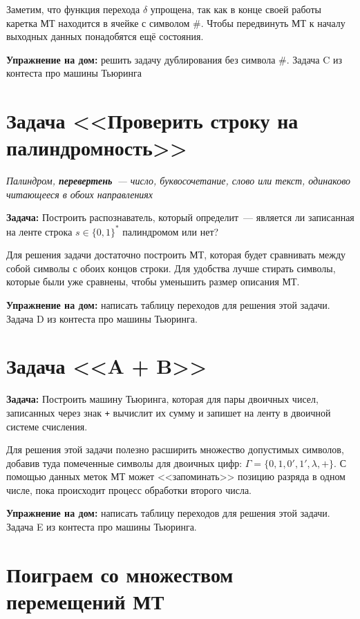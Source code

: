 \documentclass[
    11pt,
    a4paper
]{article}
\theoremstyle{definition}
\begin{document}
Заметим, что функция перехода $\delta$ упрощена, так как в конце своей работы каретка МТ находится в ячейке с символом \#. Чтобы передвинуть МТ к началу выходных данных понадобятся ещё состояния.

\textbf{Упражнение на дом:} решить задачу дублирования без символа \#. Задача C из контеста про машины Тьюринга


\section{Задача <<Проверить строку на палиндромность>>}

\textit{Палиндром, \textbf{перевертень}~--- число, буквосочетание, слово или текст, одинаково читающееся в обоих направлениях}

\textbf{Задача:} Построить распознаватель, который определит~--- является ли записанная на ленте строка $s \in \{0, 1\}^*$ палиндромом или нет?

Для решения задачи достаточно построить МТ, которая будет сравнивать между собой символы с обоих концов строки. Для удобства лучше стирать символы, которые были уже сравнены, чтобы уменьшить размер описания МТ.

\textbf{Упражнение на дом:} написать таблицу переходов для решения этой задачи. Задача D из контеста про машины Тьюринга.

\section{Задача <<A + B>>}

\textbf{Задача:} Построить машину Тьюринга, которая для пары двоичных чисел, записанных через знак \texttt{+} вычислит их сумму и запишет на ленту в двоичной системе счисления.

Для решения этой задачи полезно расширить множество допустимых символов, добавив туда помеченные символы для двоичных цифр: $\Gamma = \{0, 1, 0', 1', \lambda, +\}$. С помощью данных меток МТ может <<запоминать>> позицию разряда в одном числе, пока происходит процесс обработки второго числа.

\textbf{Упражнение на дом:} написать таблицу переходов для решения этой задачи. Задача E из контеста про машины Тьюринга.

\section{Поиграем со множеством перемещений МТ}
\end{document}
